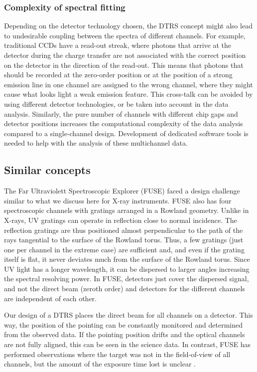 \documentclass[linenumbers]{aastex631}
\begin{document}
\subsubsection{Complexity of spectral fitting}
Depending on the detector technology chosen, the DTRS concept might also lead to undesirable coupling between the spectra of different channels. For example, traditional CCDs have a read-out streak, where photons that arrive at the detector during the charge transfer are not associated with the correct position on the detector in the direction of the read-out. This means that photons that should be recorded at the zero-order position or at the position of a strong emission line in one channel are assigned to the wrong channel, where they might cause what looks light a weak emission feature. This cross-talk can be avoided by using different detector technologies, or be taken into account in the data analysis. Similarly, the pure number of channels with different chip gaps and detector positions increases the computational complexity of the data analysis compared to a single-channel design. Development of dedicated software tools is needed to help with the analysis of these multichannel data.



\subsection{Similar concepts}

The Far Ultraviolett Spectroscopic Explorer (FUSE) \citep{2000ApJ...538L...1M} faced a design challenge similar to what we discuss here for X-ray instruments. FUSE also has four spectroscopic channels with gratings arranged in a Rowland geometry. Unlike in X-rays, UV gratings can operate in reflection close to normal incidence. The reflection gratings are thus positioned almost perpendicular to the path of the rays tangential to the surface of the Rowland torus. Thus, a few gratings (just one per channel in the extreme case) are sufficient and, and even if the grating itself is flat, it never deviates much from the surface of the Rowland torus. Since UV light has a longer wavelength, it can be dispersed to larger angles increasing the spectral resolving power. In FUSE, detectors just cover the dispersed signal, and not the direct beam (zeroth order) and detectors for the different channels are independent of each other.

Our design of a DTRS places the direct beam for all channels on a detector. This way, the position of the pointing can be constantly monitored and determined from the observed data. If the pointing position drifts and the optical channels are not fully aligned, this can be seen in the science data. In contrast, FUSE has performed observations where the target was not in the field-of-view of all channels, but the amount of the exposure time lost is unclear \citep{2000ApJ...538L...1M}.
\end{document}
